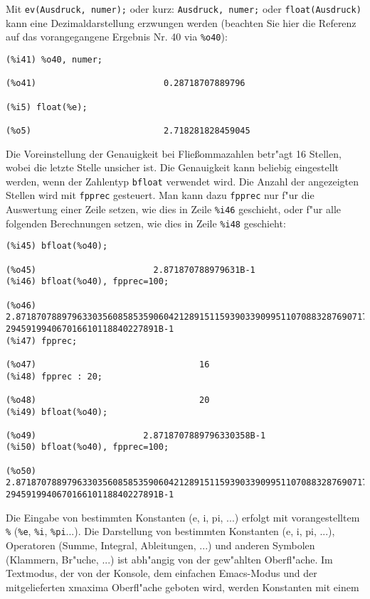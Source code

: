 \documentclass[spanish,12pt,a4paper]{article}
\begin{document}
Mit \verb|ev(Ausdruck, numer);| oder kurz: \verb|Ausdruck, numer;| oder \verb|float(Ausdruck)| kann eine Dezimaldarstellung erzwungen werden (beachten Sie hier die Referenz auf das vorangegangene Ergebnis Nr. 40 via \verb|%o40|):

\scriptsize
\begin{verbatim}
(%i41) %o40, numer;

(%o41)                         0.28718707889796

(%i5) float(%e);

(%o5)                          2.718281828459045
\end{verbatim}
\normalsize

Die Voreinstellung der Genauigkeit bei Flie{\ss}ommazahlen betr"agt 16 Stellen, wobei die letzte Stelle unsicher ist. Die Genauigkeit kann beliebig eingestellt werden, wenn der Zahlentyp \verb|bfloat| verwendet wird. Die Anzahl der angezeigten Stellen wird mit \verb|fpprec| gesteuert. Man kann dazu \verb|fpprec| nur f"ur die Auswertung einer Zeile setzen, wie dies in Zeile \verb|%i46| geschieht, oder f"ur alle folgenden Berechnungen setzen, wie dies in Zeile \verb|%i48| geschieht:

\scriptsize
\begin{verbatim}
(%i45) bfloat(%o40);

(%o45)                       2.871870788979631B-1
(%i46) bfloat(%o40), fpprec=100;

(%o46) 2.871870788979633035608585359060421289151159390339099511070883287690717#
294591994067016610118840227891B-1
(%i47) fpprec;

(%o47)                                16
(%i48) fpprec : 20;

(%o48)                                20
(%i49) bfloat(%o40);

(%o49)                     2.8718707889796330358B-1
(%i50) bfloat(%o40), fpprec=100;

(%o50) 2.871870788979633035608585359060421289151159390339099511070883287690717#
294591994067016610118840227891B-1
\end{verbatim}
\normalsize


Die Eingabe von bestimmten Konstanten (e, i, pi, ...) erfolgt mit vorangestelltem \verb|%| (\verb|%e|, \verb|%i|, \verb|%pi|...).
Die Darstellung von bestimmten Konstanten (e, i, pi, ...), Operatoren (Summe, Integral, Ableitungen, ...) und anderen Symbolen (Klammern, Br"uche, ...) ist abh"angig von der gew"ahlten Oberfl"ache. Im Textmodus, der von der Konsole, dem einfachen Emacs-Modus und der mitgelieferten xmaxima Oberfl"ache geboten wird, werden Konstanten mit einem %
\end{document}
